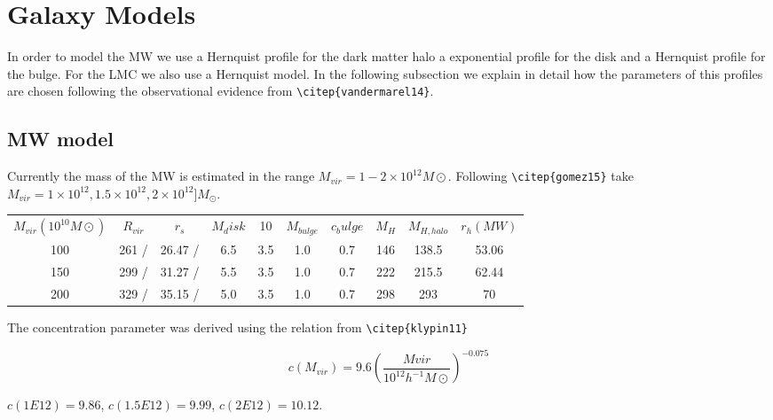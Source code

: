\section{Galaxy Models}

In order to model the MW we use a Hernquist profile for the dark matter halo 
a exponential profile for the disk and a Hernquist profile for the bulge. For
the LMC we also use a Hernquist model. In the following subsection we explain 
in detail how the parameters of this profiles are chosen following the observational 
evidence from \verb+\citep{vandermarel14}+. 

\subsection{MW model}

Currently the mass of the MW is estimated in the range $M_{vir} = 1 - 2 \times 10 ^12 M\odot$. Following 
\verb+\citep{gomez15}+ take $M_{vir} = 1 \times 10^{12}, 1.5\times 10^{12}, 2 \times 10^{12}] M_{\odot}$.

\begin{table}[H]{\label{tab:MW}}
\begin{center}
\begin{tabular}{c c c c c c c c c c}
\hline
\hline
$M_{vir} (10^10M\odot)$ & $R_{vir}$ & $r_s$ & $M_disk$ & 10 & $M_{bulge}$ & $c_bulge $ & $M_{H}$ & $M_{H,halo}$ & $r_h(MW) $ \\
100 & 261 /  & 26.47 /  & 6.5 & 3.5 & 1.0 & 0.7 & 146 & 138.5 & 53.06 \\
150 & 299 /  & 31.27 /  & 5.5 & 3.5 & 1.0 & 0.7 & 222 & 215.5 & 62.44 \\
200 & 329 /  & 35.15 /  & 5.0 & 3.5 & 1.0 & 0.7 & 298 & 293 & 70 \\
\hline
\end{tabular}
\end{center}
\end{table}

The concentration parameter was derived using the relation from 
\verb+\citep{klypin11}+ 

\begin{equation}
c(M_{vir}) = 9.6(\dfrac{Mvir}{10^12 h^{-1} M\odot})^{-0.075}
\end{equation}

$c(1E12) = 9.86$, $c(1.5E12) = 9.99$, $c(2E12) = 10.12$. 

